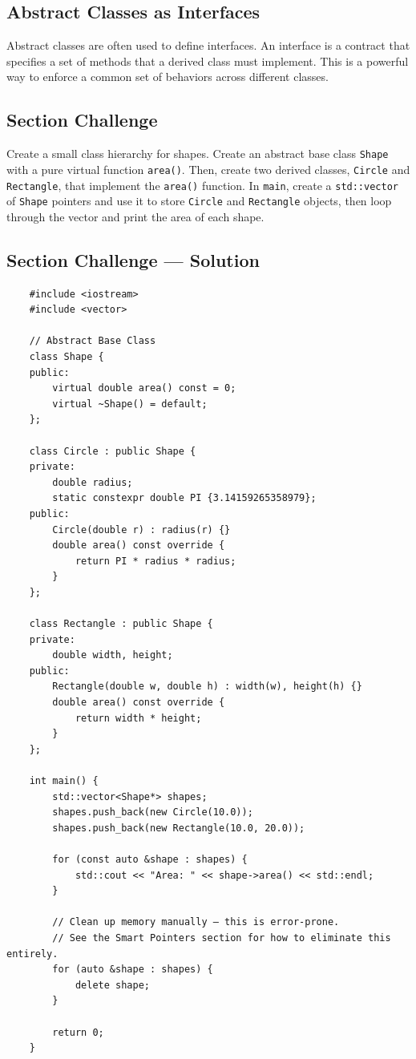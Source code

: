 \subsection{Abstract Classes as Interfaces}
Abstract classes are often used to define interfaces. An interface is a contract that specifies a set of methods that a derived class must implement. This is a powerful way to enforce a common set of behaviors across different classes.

\subsection{Section Challenge}
Create a small class hierarchy for shapes. Create an abstract base class \texttt{Shape} with a pure virtual function \texttt{area()}. Then, create two derived classes, \texttt{Circle} and \texttt{Rectangle}, that implement the \texttt{area()} function. In \texttt{main}, create a \texttt{std::vector} of \texttt{Shape} pointers and use it to store \texttt{Circle} and \texttt{Rectangle} objects, then loop through the vector and print the area of each shape.

\subsection{Section Challenge --- Solution}
\begin{lstlisting}
	#include <iostream>
	#include <vector>

	// Abstract Base Class
	class Shape {
	public:
		virtual double area() const = 0;
		virtual ~Shape() = default;
	};

	class Circle : public Shape {
	private:
		double radius;
		static constexpr double PI {3.14159265358979};
	public:
		Circle(double r) : radius(r) {}
		double area() const override {
			return PI * radius * radius;
		}
	};

	class Rectangle : public Shape {
	private:
		double width, height;
	public:
		Rectangle(double w, double h) : width(w), height(h) {}
		double area() const override {
			return width * height;
		}
	};

	int main() {
		std::vector<Shape*> shapes;
		shapes.push_back(new Circle(10.0));
		shapes.push_back(new Rectangle(10.0, 20.0));

		for (const auto &shape : shapes) {
			std::cout << "Area: " << shape->area() << std::endl;
		}

		// Clean up memory manually — this is error-prone.
		// See the Smart Pointers section for how to eliminate this entirely.
		for (auto &shape : shapes) {
			delete shape;
		}

		return 0;
	}
\end{lstlisting}

